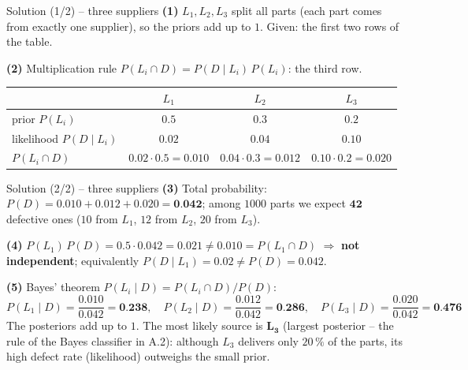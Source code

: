\documentclass[aspectratio=169,11pt]{beamer}
\begin{document}
\begin{frame}{Solution (1/2) -- three suppliers}
  \textbf{(1)} $L_1,L_2,L_3$ split all parts (each part comes from exactly
  one supplier), so the priors add up to $1$. Given: the first two rows of
  the table.

  \medskip
  \textbf{(2)} Multiplication rule $P(L_i\cap D)=P(D\mid L_i)\,P(L_i)$: the
  third row.
  \begin{center}
    \renewcommand{\arraystretch}{1.25}
    \begin{tabular}{@{}lccc@{}}
      \toprule
      & $L_1$ & $L_2$ & $L_3$\\
      \midrule
      prior $P(L_i)$ & $0.5$ & $0.3$ & $0.2$\\
      likelihood $P(D\mid L_i)$ & $0.02$ & $0.04$ & $0.10$\\
      $P(L_i\cap D)$ & $0.02\cdot0.5=\mathbf{0.010}$ & $0.04\cdot0.3=\mathbf{0.012}$ & $0.10\cdot0.2=\mathbf{0.020}$\\
      \bottomrule
    \end{tabular}
  \end{center}
\end{frame}

\begin{frame}{Solution (2/2) -- three suppliers}
  \textbf{(3)} Total probability:
  $P(D)=0.010+0.012+0.020=\textbf{0.042}$; among $1000$ parts we expect
  $\textbf{42}$ defective ones ($10$ from $L_1$, $12$ from $L_2$, $20$ from
  $L_3$).

  \medskip
  \textbf{(4)} $P(L_1)\,P(D)=0.5\cdot0.042=0.021\neq0.010=P(L_1\cap D)$
  $\Rightarrow$ \textbf{not independent}; equivalently
  $P(D\mid L_1)=0.02\neq P(D)=0.042$.

  \medskip
  \textbf{(5)} Bayes' theorem $P(L_i\mid D)=P(L_i\cap D)/P(D)$:
  \[
    P(L_1\mid D)=\frac{0.010}{0.042}=\textbf{0.238},\quad
    P(L_2\mid D)=\frac{0.012}{0.042}=\textbf{0.286},\quad
    P(L_3\mid D)=\frac{0.020}{0.042}=\textbf{0.476}
  \]
  The posteriors add up to $1$. The most likely source is $\mathbf{L_3}$
  (largest posterior -- the rule of the Bayes classifier in A.2): although
  $L_3$ delivers only $20\,\%$ of the parts, its high defect rate
  (likelihood) outweighs the small prior.
\end{frame}
\end{document}
